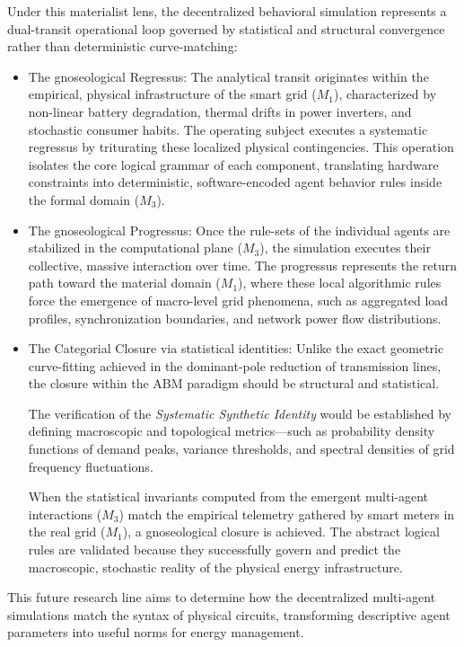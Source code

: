 \documentclass[11pt, a4paper]{article}
\begin{document}
Under this materialist lens, the decentralized behavioral simulation represents a dual-transit operational loop governed by statistical and structural convergence rather than deterministic curve-matching:
\begin{itemize}
\item {The gnoseological Regressus:} The analytical transit originates within the empirical, physical infrastructure of the smart grid ($M_1$), characterized by non-linear battery degradation, thermal drifts in power inverters, and stochastic consumer habits. The operating subject executes a systematic regressus by triturating these localized physical contingencies. This operation isolates the core logical grammar of each component, translating hardware constraints into deterministic, software-encoded agent behavior rules inside the formal domain ($M_3$).

\item {The gnoseological Progressus:} Once the rule-sets of the individual agents are stabilized in the computational plane ($M_3$), the simulation executes their collective, massive interaction over time. The progressus represents the return path toward the material domain ($M_1$), where these local algorithmic rules force the emergence of macro-level grid phenomena, such as aggregated load profiles, synchronization boundaries, and network power flow distributions.

\item {The Categorial Closure via statistical identities:} Unlike the exact geometric curve-fitting achieved in the dominant-pole reduction of transmission lines, the closure within the ABM paradigm should be structural and statistical.

The verification of the \textit{Systematic Synthetic Identity} would be established by defining macroscopic and topological metrics---such as probability density functions of demand peaks, variance thresholds, and spectral densities of grid frequency fluctuations.

When the statistical invariants computed from the emergent multi-agent interactions ($M_3$) match the empirical telemetry gathered by smart meters in the real grid ($M_1$), a gnoseological closure is achieved. The abstract logical rules are validated because they successfully govern and predict the macroscopic, stochastic reality of the physical energy infrastructure.
\end{itemize}

This future research line aims to determine how the decentralized multi-agent simulations match the syntax of physical circuits, transforming descriptive agent parameters into useful norms for energy management.
\end{document}
